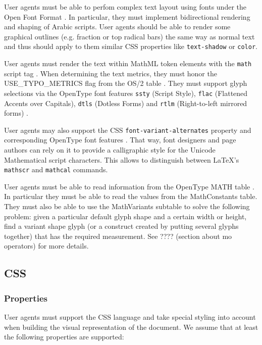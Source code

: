 User agents must be able to perfom complex text layout \cite{CTL} using
fonts under the Open Font Format \cite{OpenFontFormat3}. In particular, they
must implement bidirectional rendering and shaping of Arabic scripts.
User agents should be able to render some graphical outlines (e.g. fraction
or top radical bars) the same way as normal text and thus should apply to them
similar CSS properties like {\tt text-shadow} or {\tt color}.

User agents must render the text within MathML token elements with the
{\tt math} script tag \cite{OpenFontFormat3}. When determining the
text metrics, they must honor the USE\_TYPO\_METRICS flag from the OS/2 table
\cite{OpenFontFormat3}.
They must support glyph selections via the OpenType font
features {\tt ssty} (Script Style), {\tt flac}
(Flattened Accents over Capitals), {\tt dtls} (Dotless Forms)
and {\tt rtlm} (Right-to-left mirrored forms) \cite{OpenFontFormat3}.

User agents may also support the CSS {\tt font-variant-alternates} property
and corresponding OpenType font features \cite{CSS3Font} \cite{OpenFontFormat3}.
That way,  font designers and page
authors can rely on it to provide a calligraphic style for the
Unicode Mathematical script characters. This allows to distinguish between
LaTeX's {\tt mathscr} and {\tt mathcal} commands.

User agents must be able to read information from the
OpenType MATH table \cite{OpenFontFormat3}.
In particular they must be able to read the values from the MathConstants
table. They must also be able to use the MathVariants subtable to solve the
following problem: given a particular default glyph shape and a
certain width or height, find a variant shape glyph (or a construct created by
putting several glyphs together) that has the required measurement.
See ???? (section about mo operators) for more details.

\subsection{CSS}

\subsubsection{Properties}

User agents must support the CSS language \cite{CSS2} and take special styling
into account when building the visual representation of the document. We assume
that at least the following properties are supported:

